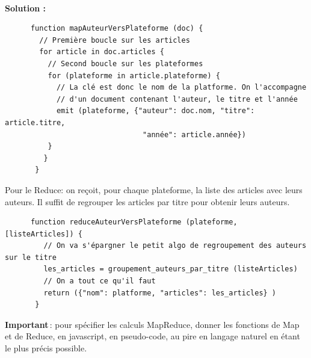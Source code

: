 \documentclass[11pt,a4paper]{article}
\newenvironment{solution}[0]{
~\\ \color{red} \textbf{Solution : }\color{black}}{%
}
\begin{document}
\begin{enumerate}
\begin{solution}
    \begin{small}
        \begin{verbatim}
      function mapAuteurVersPlateforme (doc) {
        // Première boucle sur les articles
        for article in doc.articles {
          // Second boucle sur les plateformes
          for (plateforme in article.plateforme) {
            // La clé est donc le nom de la platforme. On l'accompagne
            // d'un document contenant l'auteur, le titre et l'année
            emit (plateforme, {"auteur": doc.nom, "titre": article.titre, 
                                "année": article.année})
          }
         } 
       }
    \end{verbatim}
    \end{small}
    
    Pour le Reduce: on reçoit, pour chaque plateforme, la liste des articles avec leurs auteurs. 
    Il suffit de regrouper les articles par titre pour obtenir leurs auteurs.
    
        \begin{small}
    \begin{verbatim}
      function reduceAuteurVersPlateforme (plateforme, [listeArticles]) {
         // On va s'épargner le petit algo de regroupement des auteurs sur le titre
         les_articles = groupement_auteurs_par_titre (listeArticles)
         // On a tout ce qu'il faut
         return ({"nom": platforme, "articles": les_articles} )
       }
    \end{verbatim}
    \end{small}
    
\end{solution}


   \textbf{Important}\,: pour spécifier les calculs MapReduce, donner les fonctions de Map et de Reduce, en javascript,
en pseudo-code, au pire en langage naturel en étant le plus précis possible. 
   


\end{enumerate}
\end{document}
